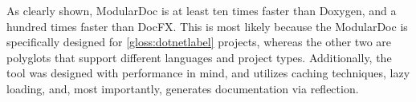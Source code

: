 As clearly shown, ModularDoc is at least ten times faster than Doxygen, and a hundred times faster than DocFX.
This is most likely because the ModularDoc is specifically designed for \ref{gloss:dotnetlabel} projects, whereas the other two are polyglots that support different languages and project types.
Additionally, the tool was designed with performance in mind, and utilizes caching techniques, lazy loading, and, most importantly, generates documentation via reflection.